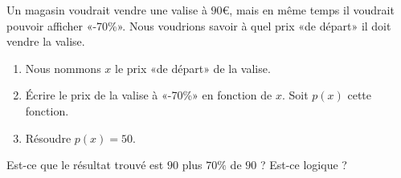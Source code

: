 
\begin{exercice}\label{exoSeconde-0067}

    Un magasin voudrait vendre une valise à \( 90\)€, mais en même temps il voudrait pouvoir afficher «-70\%». Nous voudrions savoir à quel prix «de départ» il doit vendre la valise.
    \begin{enumerate}
        \item
            Nous nommons \( x\) le prix «de départ» de la valise.
        \item
            Écrire le prix de la valise à «-70\%» en fonction de \( x\). Soit \( p(x)\) cette fonction.
        \item
            Résoudre \( p(x)=50\).
    \end{enumerate}
    Est-ce que le résultat trouvé est \( 90\) plus \( 70\%\) de \( 90\) ? Est-ce logique ?

\end{exercice}
